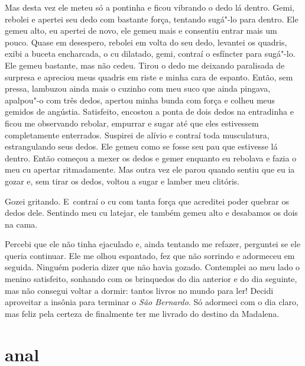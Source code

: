 Mas desta vez ele meteu só a pontinha e ficou vibrando o dedo lá dentro.
Gemi, rebolei e apertei seu dedo com bastante força, tentando sugá"-lo
para dentro. Ele gemeu alto, eu apertei de novo, ele gemeu mais e
consentiu entrar mais um pouco. Quase em desespero, rebolei em volta do
seu dedo, levantei os quadris, exibi a buceta encharcada, o cu dilatado,
gemi, contraí o esfíncter para sugá"-lo. Ele gemeu bastante, mas não
cedeu. Tirou o dedo me deixando paralisada de surpresa e apreciou meus
quadris em riste e minha cara de espanto. Então, sem pressa, lambuzou
ainda mais o cuzinho com meu suco que ainda pingava, apalpou"-o com três
dedos, apertou minha bunda com força e colheu meus gemidos de angústia.
Satisfeito, encostou a ponta de dois dedos na entradinha e ficou me
observando rebolar, empurrar e sugar até que eles estivessem
completamente enterrados. Suspirei de alívio e contraí toda musculatura,
estrangulando seus dedos. Ele gemeu como se fosse seu pau que estivesse
lá dentro. Então começou a mexer os dedos e gemer enquanto eu rebolava e
fazia o meu cu apertar ritmadamente. Mas outra vez ele parou quando
sentiu que eu ia gozar e, sem tirar os dedos, voltou a sugar e lamber
meu clitóris.

Gozei gritando. E~contraí o cu com tanta força que acreditei poder
quebrar os dedos dele. Sentindo meu cu latejar, ele também gemeu alto e
desabamos os dois na cama.

Percebi que ele não tinha ejaculado e, ainda tentando me refazer,
perguntei se ele queria continuar. Ele me olhou espantado, fez que não
sorrindo e adormeceu em seguida. Ninguém poderia dizer que não havia
gozado. Contemplei ao meu lado o menino satisfeito, sonhando com os
brinquedos do dia anterior e do dia seguinte, mas não consegui voltar a
dormir: tantos livros no mundo para ler! Decidi aproveitar a insônia
para terminar o \emph{São Bernardo}. Só adormeci com o dia claro, mas
feliz pela certeza de finalmente ter me livrado do destino da Madalena.

\chapter{ anal}

